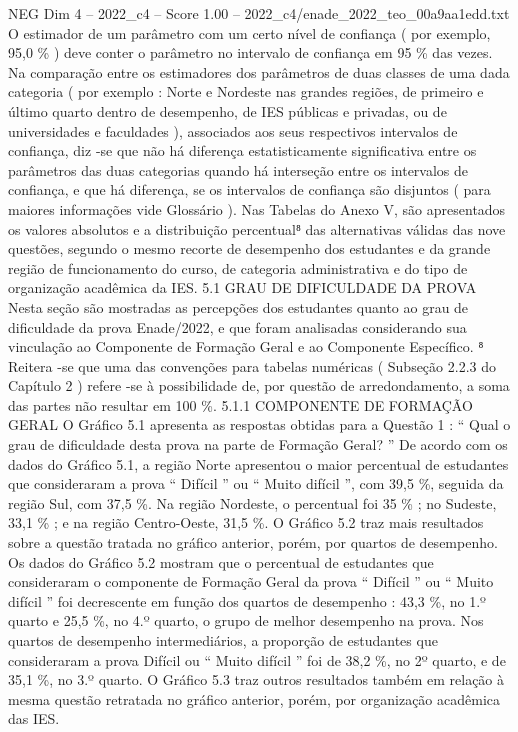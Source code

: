 \begin{textsample}{NEG Dim 4 – 2022\_c4 – Score 1.00 – 2022\_c4/enade\_2022\_teo\_00a9aa1edd.txt}
O estimador de um parâmetro com um certo nível de confiança ( por exemplo, 95,0 \% ) deve conter o parâmetro no intervalo de confiança em 95 \% das vezes.
Na comparação entre os estimadores dos parâmetros de duas classes de uma dada categoria ( por exemplo : Norte e Nordeste nas grandes regiões, de primeiro e último quarto dentro de desempenho, de IES públicas e privadas, ou de universidades e faculdades ), associados aos seus respectivos intervalos de confiança, diz -se que não há diferença estatisticamente significativa entre os parâmetros das duas categorias quando há interseção entre os intervalos de confiança, e que há diferença, se os intervalos de confiança são disjuntos ( para maiores informações vide Glossário ).
Nas Tabelas do Anexo V, são apresentados os valores absolutos e a distribuição percentual⁸ das alternativas válidas das nove questões, segundo o mesmo recorte de desempenho dos estudantes e da grande região de funcionamento do curso, de categoria administrativa e do tipo de organização acadêmica da IES. 5.1 GRAU DE DIFICULDADE DA PROVA Nesta seção são mostradas as percepções dos estudantes quanto ao grau de dificuldade da prova Enade/2022, e que foram analisadas considerando sua vinculação ao Componente de Formação Geral e ao Componente Específico. ⁸ Reitera -se que uma das convenções para tabelas numéricas ( Subseção 2.2.3 do Capítulo 2 ) refere -se à possibilidade de, por questão de arredondamento, a soma das partes não resultar em 100 \%. 5.1.1 COMPONENTE DE FORMAÇÃO GERAL O Gráfico 5.1 apresenta as respostas obtidas para a Questão 1 : “ Qual o grau de dificuldade desta prova na parte de Formação Geral? ” De acordo com os dados do Gráfico 5.1, a região Norte apresentou o maior percentual de estudantes que consideraram a prova “ Difícil ” ou “ Muito difícil ”, com 39,5 \%, seguida da região Sul, com 37,5 \%.
Na região Nordeste, o percentual foi 35 \% ; no Sudeste, 33,1 \% ; e na região Centro-Oeste, 31,5 \%.
O Gráfico 5.2 traz mais resultados sobre a questão tratada no gráfico anterior, porém, por quartos de desempenho.
Os dados do Gráfico 5.2 mostram que o percentual de estudantes que consideraram o componente de Formação Geral da prova “ Difícil ” ou “ Muito difícil ” foi decrescente em função dos quartos de desempenho : 43,3 \%, no 1.º quarto e 25,5 \%, no 4.º quarto, o grupo de melhor desempenho na prova.
Nos quartos de desempenho intermediários, a proporção de estudantes que consideraram a prova Difícil ou “ Muito difícil ” foi de 38,2 \%, no 2º quarto, e de 35,1 \%, no 3.º quarto.
O Gráfico 5.3 traz outros resultados também em relação à mesma questão retratada no gráfico anterior, porém, por organização acadêmica das IES.

\end{textsample}

